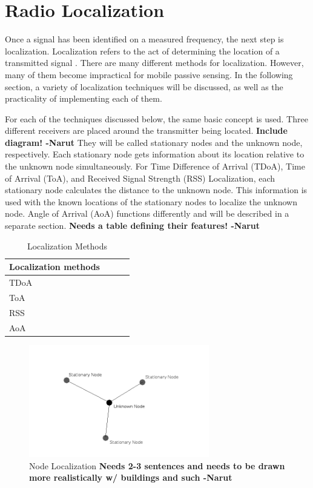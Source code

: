 \section{Radio Localization}
Once a signal has been identified on a measured frequency, the next step is localization. Localization refers to the act of determining the location of a transmitted signal \cite{local_conf}. There are many different methods for localization. However, many of them become impractical for mobile passive sensing. In the following section, a variety of localization techniques will be discussed, as well as the practicality of implementing each of them.\par
For each of the techniques discussed below, the same basic concept is used. Three different receivers are placed around the transmitter being located. \textbf{Include diagram! -Narut} They will be called stationary nodes and the unknown node, respectively. Each stationary node gets information about its location relative to the unknown node simultaneously. For Time Difference of Arrival (TDoA), Time of Arrival (ToA), and Received Signal Strength (RSS) Localization, each stationary node calculates the distance to the unknown node. This information is used with the known locations of the stationary nodes to localize the unknown node. Angle of Arrival (AoA) functions differently and will be described in a separate section. \textbf{Needs a table defining their features! -Narut}
\begin{table}[ht]
\centering
\caption{Localization Methods}
\label{table:local_methods}
\begin{tabular}{|l|l|l|l|}
    \hline
  Localization methods  & & & \\ \hline
         TDoA           & & & \\
          ToA           & & & \\
          RSS           & & & \\
          AoA           & & & \\
    \hline
\end{tabular}
\end{table}\par
\begin{figure}[ht]
\centering
\includegraphics[width=0.70\textwidth]{img/node-localization-lines.png}
\caption{Node Localization \textbf{Needs 2-3 sentences and needs to be drawn more realistically w/ buildings and such -Narut}}
\label{fig:node_localization}
\end{figure}\par
